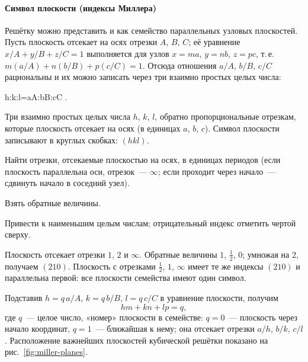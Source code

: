 \paragraph{Символ плоскости (индексы Миллера)}
Решётку можно представить и как семейство параллельных узловых
плоскостей. Пусть плоскость отсекает на осях отрезки $A$, $B$, $C$; её
уравнение $x/A+y/B+z/C=1$ выполняется для узлов $x=ma$, $y=nb$, $z=pc$, т.\,е.
$m(a/A)+n(b/B)+p(c/C)=1$. Отсюда отношения $a/A$, $b/B$, $c/C$ рациональны и
их можно записать через три взаимно простых целых числа:
\begin{keyeq}\label{eq:miller}
h:k:l=\frac aA:\frac bB:\frac cC .
\end{keyeq}

\begin{opredelenie}
Три взаимно простых целых числа $h$, $k$, $l$, обратно пропорциональные
отрезкам, которые плоскость отсекает на осях (в единицах $a$, $b$, $c$).
Символ плоскости записывают в круглых скобках: $(hkl)$.
\end{opredelenie}

\begin{shagi}
\item Найти отрезки, отсекаемые плоскостью на осях, в единицах периодов
(если плоскость параллельна оси, отрезок~— $\infty$; если проходит через
начало~— сдвинуть начало в соседний узел).
\item Взять обратные величины.
\item Привести к наименьшим целым числам; отрицательный индекс отметить
чертой сверху.
\end{shagi}

\begin{primer}
Плоскость отсекает отрезки $1$, $2$ и $\infty$. Обратные величины $1$,
$\frac12$, $0$; умножая на 2, получаем $(210)$. Плоскость с отрезками
$\frac12$, $1$, $\infty$ имеет те же индексы $(210)$ и параллельна первой:
все плоскости семейства имеют один символ.
\end{primer}

Подставив $h=q\,a/A$, $k=q\,b/B$, $l=q\,c/C$ в уравнение плоскости, получим
\begin{equation}\label{eq:plane-q}
hm+kn+lp=q ,
\end{equation}
где $q$~— целое число, «номер» плоскости в семействе: $q=0$~— плоскость
через начало координат, $q=1$~— ближайшая к нему; она отсекает отрезки
$a/h$, $b/k$, $c/l$. Расположение важнейших плоскостей кубической решётки
показано на рис.~\ref{fig:miller-planes}.


